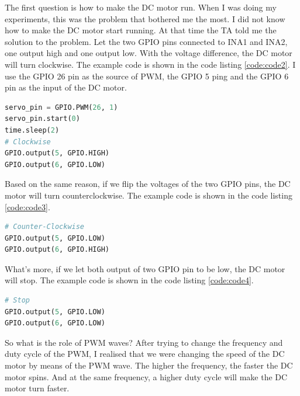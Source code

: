 \documentclass[12pt]{report}
\begin{document}
The first question is how to make the DC motor run. When I was doing my experiments, this was the problem that bothered me the most. I did not know how to make the DC motor start running. At that time the TA told me the solution to the problem. Let the two GPIO pins connected to INA1 and INA2, one output high and one output low. With the voltage difference, the DC motor will turn clockwise. The example code is shown in the code listing \ref{code:code2}. I use the GPIO 26 pin as the source of PWM, the GPIO 5 ping and the GPIO 6 pin as the input of the DC motor.\par
\begin{center}
\begin{lstlisting}[language=Python, label=code:code2, caption=Example code of clockwise] 
servo_pin = GPIO.PWM(26, 1)
servo_pin.start(0)
time.sleep(2)
# Clockwise
GPIO.output(5, GPIO.HIGH)
GPIO.output(6, GPIO.LOW)
\end{lstlisting}
\end{center}\vspace{-2em}
Based on the same reason, if we flip the voltages of the two GPIO pins, the DC motor will turn counterclockwise. The example code is shown in the code listing \ref{code:code3}.
\begin{center}
\begin{lstlisting}[language=Python, label=code:code3, caption=Example code of counter-clockwise] 
# Counter-Clockwise
GPIO.output(5, GPIO.LOW)
GPIO.output(6, GPIO.HIGH)
\end{lstlisting}
\end{center}\vspace{-2em}
What's more, if we let  both output of two GPIO pin to be low, the DC motor will stop. The example code is shown in the code listing \ref{code:code4}. \par 
\begin{center}
\begin{lstlisting}[language=Python, label=code:code4, caption=Example code of stop] 
# Stop
GPIO.output(5, GPIO.LOW)
GPIO.output(6, GPIO.LOW)
\end{lstlisting}
\end{center}\vspace{-2em}
So what is the role of PWM waves? After trying to change the frequency and duty cycle of the PWM, I realised that we were changing the speed of the DC motor by means of the PWM wave. The higher the frequency, the faster the DC motor spins. And at the same frequency, a higher duty cycle will make the DC motor turn faster.\par
\end{document}
